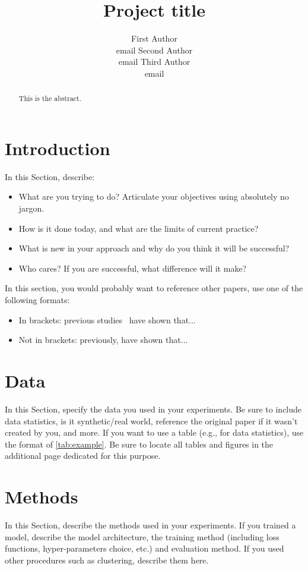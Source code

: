 \documentclass[11pt]{article}
\title{Project title}
\author{First Author \\email\And
  Second Author \\email\And
  Third Author \\email}
\begin{document}
\maketitle
\begin{abstract}
This is the abstract.
\end{abstract}

\section{Introduction}

In this Section, describe:
\begin{itemize}
    \item What are you trying to do? Articulate your objectives using absolutely no jargon.
    \item How is it done today, and what are the limits of current practice?
    \item What is new in your approach and why do you think it will be successful?
    \item Who cares? If you are successful, what difference will it make?
\end{itemize}

In this section, you would probably want to reference other papers, use one of the following formats:
\begin{itemize}
    \item In brackets: previous studies~\cite{silberer2014learning} have shown that...
    \item Not in brackets: previously, \citet{silberer2014learning} have shown that...
\end{itemize}

\section{Data}
In this Section, specify the data you used in your experiments. Be sure to include data statistics, is it synthetic/real world, reference the original paper if it wasn't created by you, and more. If you want to use a table (e.g., for data statistics), use the format of \cref{tab:example}. Be sure to locate all tables and figures in the additional page dedicated for this purpose.

\section{Methods}
In this Section, describe the methods used in your experiments. If you trained a model, describe the model architecture, the training method (including loss functions, hyper-parameters choice, etc.) and evaluation method. If you used other procedures such as clustering, describe them here.
\end{document}

